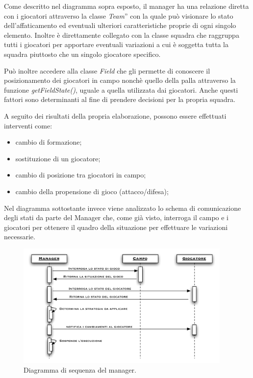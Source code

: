 \documentclass[aps,letterpaper,10pt]{article}
\begin{document}
Come descritto nel diagramma sopra esposto, il manager ha una relazione diretta con i giocatori attraverso la classe \emph{Team}'' con la quale pu\`o visionare lo stato dell'affaticamento ed eventuali ulteriori caratteristiche proprie di ogni singolo elemento. Inoltre \`e direttamente collegato con la classe squadra che raggruppa tutti i giocatori per apportare eventuali variazioni a cui \`e soggetta tutta la squadra piuttosto che un singolo giocatore specifico. \vspace{3mm}

Pu\`o inoltre accedere alla classe \emph{Field} che gli permette di conoscere il posizionamento dei giocatori in campo nonch\`e quello della palla attraverso la funzione \emph{getFieldState()}, uguale a quella utilizzata dai giocatori. Anche questi fattori sono determinanti al fine di prendere decisioni per la propria squadra. \vspace{3mm}

A seguito dei risultati della propria elaborazione, possono essere effettuati interventi come:

\begin{itemize}
	\item cambio di formazione;
	\item sostituzione di un giocatore;
	\item cambio di posizione tra giocatori in campo;
	\item cambio della propensione di gioco (attacco/difesa);
\end{itemize}

Nel diagramma sottostante invece viene analizzato lo schema di comunicazione degli stati da parte del Manager che, come gi\`a visto, interroga il campo e i giocatori per ottenere il quadro della situazione per effettuare le variazioni necessarie. \vspace{3mm}

\begin{figure}[H]
	\begin{center}
		\includegraphics[width=400px]{images/manager-sequence.pdf}
	\end{center}
\caption{Diagramma di sequenza del manager.}
\end{figure}
\end{document}
